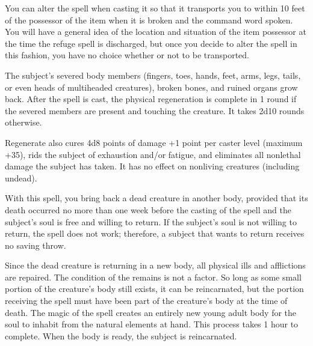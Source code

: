 \begin{multicols}{2}
\begin{small}
\smallskip\noindent You can alter the spell when casting it so that it transports you to within 10 feet of the possessor of the item when it is broken and the command word spoken. You will have a general idea of the location and situation of the item possessor at the time the refuge spell is discharged, but once you decide to alter the spell in this fashion, you have no choice whether or not to be transported.


\noindent The subject's severed body members (fingers, toes, hands, feet, arms, legs, tails, or even heads of multiheaded creatures), broken bones, and ruined organs grow back. After the spell is cast, the physical regeneration is complete in 1 round if the severed members are present and touching the creature. It takes 2d10 rounds otherwise.

\smallskip\noindent Regenerate also cures 4d8 points of damage +1 point per caster level (maximum +35), rids the subject of exhaustion and/or fatigue, and eliminates all nonlethal damage the subject has taken. It has no effect on nonliving creatures (including undead).

\noindent With this spell, you bring back a dead creature in another body, provided that its death occurred no more than one week before the casting of the spell and the subject's soul is free and willing to return. If the subject's soul is not willing to return, the spell does not work; therefore, a subject that wants to return receives no saving throw.

\smallskip\noindent Since the dead creature is returning in a new body, all physical ills and afflictions are repaired. The condition of the remains is not a factor. So long as some small portion of the creature's body still exists, it can be reincarnated, but the portion receiving the spell must have been part of the creature's body at the time of death. The magic of the spell creates an entirely new young adult body for the soul to inhabit from the natural elements at hand. This process takes 1 hour to complete.  When the body is ready, the subject is reincarnated.


\end{small}
\end{multicols}
